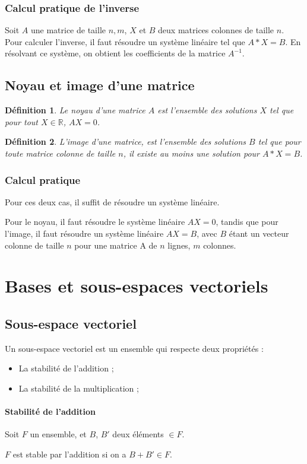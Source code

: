 \documentclass{report}
\newtheorem{mydef}{Définition}
\begin{document}
\subsection{Calcul pratique de l'inverse}
Soit $A$ une matrice de taille $n,m$, $X$ et $B$ deux matrices colonnes de taille $n$.
Pour calculer l'inverse, il faut résoudre un système linéaire tel que $A*X=B$.
En résolvant ce système, on obtient les coefficients de la matrice $A^{-1}$.

\section{Noyau et image d'une matrice}
\begin{mydef}
Le noyau d'une matrice $A$ est l'ensemble des solutions $X$ tel que pour tout $X \in \mathbb{R}$, $AX=0$.
\end{mydef}
\par
\begin{mydef}
L'image d'une matrice, est l'ensemble des solutions $B$ tel que pour toute matrice colonne de taille $n$, il existe au moins une solution pour $A*X=B$.
\end{mydef}

\subsection{Calcul pratique}
Pour ces deux cas, il suffit de résoudre un système linéaire.
\par
Pour le noyau, il faut résoudre le système linéaire $AX=0$, tandis que pour l'image, il faut résoudre un système linéaire $AX=B$, avec $B$ étant un vecteur colonne de taille $n$ pour une matrice A de $n$ lignes, $m$ colonnes.


\chapter{Bases et sous-espaces vectoriels}
\section{Sous-espace vectoriel}
Un sous-espace vectoriel est un ensemble qui respecte deux propriétés :
\begin{itemize}
\item{La stabilité de l'addition ;}
\item{La stabilité de la multiplication ;}
\end{itemize}
\subsubsection{Stabilité de l'addition}
Soit $F$ un ensemble, et $B$, $B'$ deux éléments $\in F$.
\par
$F$ est stable par l'addition si on a $B+B' \in F$.
\end{document}
